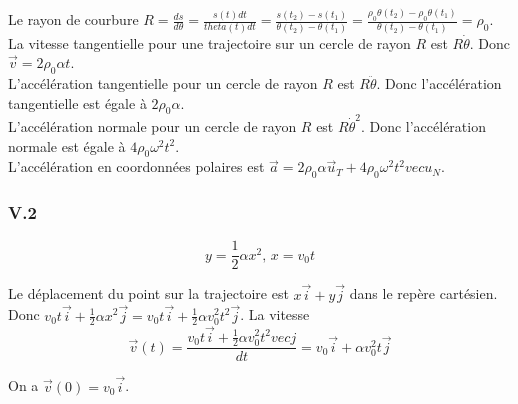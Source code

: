 \documentclass[]{book}
\theoremstyle{definition}
\begin{document}
Le rayon de courbure $R = \frac{ds}{d\theta} = \frac{s(t)dt}{theta(t)dt} = \frac{s(t_2)-s(t_1)}{\theta(t_2)-\theta(t_1)} = \frac{\rho_0\theta(t_2)-\rho_0\theta(t_1)}{\theta(t_2)-\theta(t_1)} = \rho_{0}$.\\

La vitesse tangentielle pour une trajectoire sur un cercle de rayon $R$ est $R\dot{\theta}$. Donc $\vec{v}=2\rho_0\alpha t$.\\

L'acc\'el\'eration tangentielle pour un cercle de rayon $R$ est $R\ddot{\theta}$. Donc l'acc\'el\'eration tangentielle est \'egale \`a $2\rho_{0}\alpha$.\\

L'acc\'el\'eration normale pour un cercle de rayon $R$ est $R\dot{\theta}^2$. Donc l'acc\'el\'eration normale est \'egale \`a $4\rho_{0}\omega^2t^2$.\\

L'acc\'el\'eration en coordonn\'ees polaires est $\vec{a} = 2\rho_{0}\alpha\vec{u}_{T} +  4\rho_{0}\omega^2t^2vec{u}_{N}$.

\subsubsection*{V.2}
$$y = \frac{1}{2}\alpha x^2,\, x=v_0 t$$


Le d\'eplacement du point sur la trajectoire est $x\vec{i}+y\vec{j}$ dans le rep\`ere cart\'esien. Donc $v_0 t \vec{i} + \frac{1}{2}\alpha x^2 \vec{j} = v_0 t \vec{i} + \frac{1}{2}\alpha v_0^2 t^2 \vec{j}$. La vitesse 
$$\vec{v}(t) = \frac{v_0 t \vec{i} + \frac{1}{2}\alpha v_0^2 t^2 vec{j}}{dt} = v_0 \vec{i} + \alpha v_0^2 t \vec{j}$$

On a $\vec{v}(0) = v_0 \vec{i}$.\\
\end{document}
